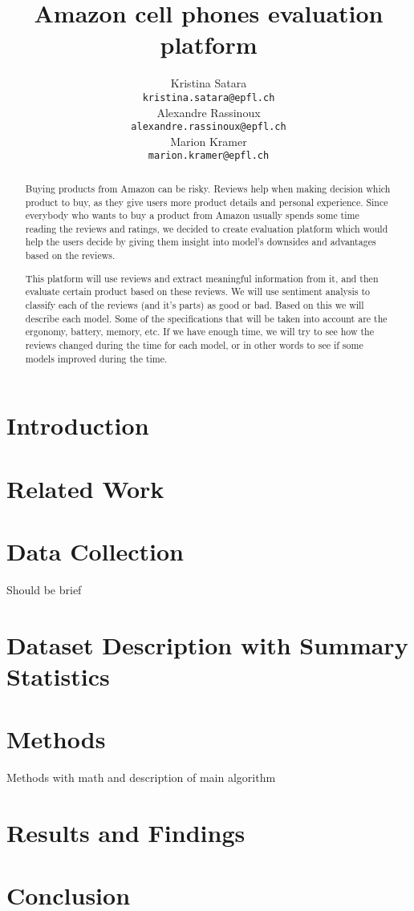 \documentclass[11pt]{article}
\title{Amazon cell phones evaluation platform}
\author{Kristina Satara \\
  {\tt  kristina.satara@epfl.ch} \\\And
  Alexandre Rassinoux \\
  {\tt  alexandre.rassinoux@epfl.ch} \\\And
Marion Kramer \\
{\tt  marion.kramer@epfl.ch} \\}
\date{}
\begin{document}
\maketitle
\begin{abstract}
  Buying products from Amazon can be risky. Reviews help when making decision which product to buy, as they give users more product details and personal experience. Since everybody who wants to buy a product from Amazon usually spends some time reading the reviews and ratings, we decided to create evaluation platform which would help the users decide by giving them insight into model's downsides and advantages based on the reviews.

This platform will use reviews and extract meaningful information from it, and then evaluate certain product based on these reviews. We will use sentiment analysis to classify each of the reviews (and it's parts) as good or bad. Based on this we will describe each model. Some of the specifications that will be taken into account are the ergonomy, battery, memory, etc. If we have enough time, we will try to see how the reviews changed during the time for each model, or in other words to see if some models improved during the time.
\end{abstract}

\section{Introduction}

\section{Related Work}

\section{Data Collection}
Should be brief

\section{Dataset Description with Summary Statistics}

\section{Methods}
Methods with math and description of main algorithm

\section{Results and Findings}

\section{Conclusion}
\end{document}
